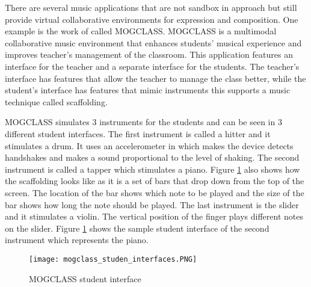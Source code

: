 
There are several music applications that are not sandbox in approach but still provide virtual collaborative environments for expression and composition. One example is the work of \cite{zhou2011mogclass} called MOGCLASS. MOGCLASS is a multimodal collaborative music environment that enhances students’ musical experience and improves teacher’s management of the classroom. This application features an interface for the teacher and a separate interface for the students. The teacher’s interface has features that allow the teacher to manage the class better, while the student’s interface has features that mimic instruments this supports a music technique called scaffolding.

MOGCLASS simulates 3 instruments for the students and can be seen in 3 different student interfaces. The first instrument is called a hitter and it stimulates a drum. It uses an accelerometer in which makes the device detects handshakes and makes a sound proportional to the level of shaking. The second instrument is called a tapper which stimulates a piano. Figure \ref{fig:mogclass_student_interface} also shows how the scaffolding looks like as it is a set of bars that drop down from the top of the screen. The location of the bar shows which note to be played and the size of the bar shows how long the note should be played. The last instrument is the slider and it stimulates a violin. The vertical position of the finger plays different notes on the slider. Figure \ref{fig:mogclass_student_interface} shows the sample student interface of the second instrument which represents the piano.

\begin{figure}[H]
    \centering
    \texttt{[image: mogclass\_studen\_interfaces.PNG]}
    \caption{MOGCLASS student interface \protect\cite{zhou2011mogclass}}
    \label{fig:mogclass_student_interface}
\end{figure}

